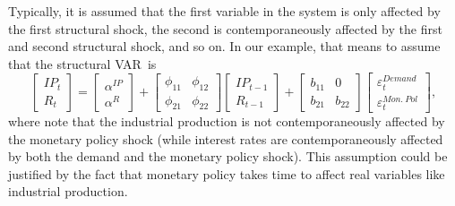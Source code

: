 \documentclass[10pt]{article}
\begin{document}
Typically, it is assumed that the first variable in the system is only
affected by the first structural shock, the second is contemporaneously
affected by the first and second structural shock, and so on. In our
example, that means to assume that the structural VAR\ is
\begin{equation}
\begin{bmatrix}
IP_{t} \\
R_{t}%
\end{bmatrix}%
=%
\begin{bmatrix}
\alpha ^{IP} \\
\alpha ^{R}%
\end{bmatrix}%
+\left[
\begin{array}{cc}
\phi _{11} & \phi _{12} \\
\phi _{21} & \phi _{22}%
\end{array}%
\right]
\begin{bmatrix}
IP_{t-1} \\
R_{t-1}%
\end{bmatrix}%
+\left[
\begin{array}{cc}
b_{11} & 0 \\
b_{21} & b_{22}%
\end{array}%
\right]
\begin{bmatrix}
\varepsilon _{t}^{Demand} \\
\varepsilon _{t}^{Mon.\ Pol}%
\end{bmatrix}%
,
\end{equation}%
where note that the industrial production is not contemporaneously affected
by the monetary policy shock (while interest rates are contemporaneously
affected by both the demand and the monetary policy shock). This assumption
could be justified by the fact that monetary policy takes time to affect
real variables like industrial production.
\end{document}
